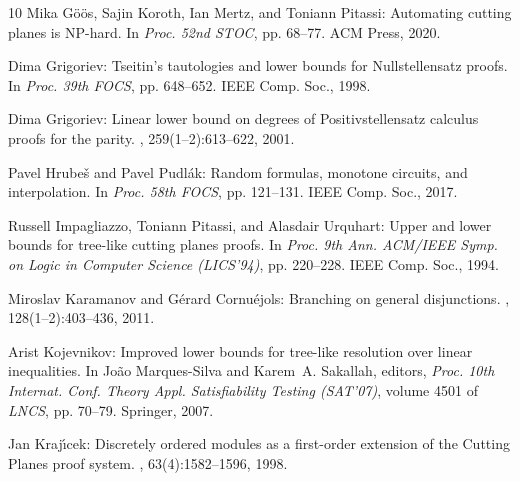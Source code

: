 \begin{thebibliography}{10}
{\sc Mika G{\"{o}}{\"{o}}s, Sajin Koroth, Ian Mertz, and Toniann Pitassi}:
  Automating cutting planes is {NP}-hard.
\newblock In {\em Proc. 52nd STOC}, pp. 68--77. ACM Press, 2020.
\newblock [\epfmtdoi{10.1145/3357713.3384248}]

{\sc Dima Grigoriev}: Tseitin's tautologies and lower bounds for
  {N}ullstellensatz proofs.
\newblock In {\em Proc. 39th FOCS}, pp. 648--652. IEEE Comp. Soc., 1998.

{\sc Dima Grigoriev}: Linear lower bound on degrees of {P}ositivstellensatz
  calculus proofs for the parity.
, 259(1--2):613--622, 2001.
\newblock [\epfmtdoi{10.1016/S0304-3975(00)00157-2}]

{\sc Pavel Hrube{\v{s}} and Pavel Pudl{\'{a}}k}: Random formulas, monotone
  circuits, and interpolation.
\newblock In {\em Proc. 58th FOCS}, pp. 121--131. IEEE Comp. Soc., 2017.

{\sc Russell Impagliazzo, Toniann Pitassi, and Alasdair Urquhart}: Upper and
  lower bounds for tree-like cutting planes proofs.
\newblock In {\em Proc. 9th Ann. ACM/IEEE Symp. on Logic in Computer Science
  (LICS'94)}, pp. 220--228. IEEE Comp. Soc., 1994.

{\sc Miroslav Karamanov and G{\'{e}}rard Cornu{\'{e}}jols}: Branching on
  general disjunctions.
, 128(1--2):403--436, 2011.
\newblock [\epfmtdoi{10.1007/s10107-009-0332-3}]

{\sc Arist Kojevnikov}: Improved lower bounds for tree-like resolution over
  linear inequalities.
\newblock In {\sc Jo{\~{a}}o Marques{-}Silva and Karem~A. Sakallah}, editors,
  {\em Proc. 10th Internat. Conf. Theory Appl. Satisfiability Testing
  (SAT'07)}, volume 4501 of {\em LNCS}, pp. 70--79. Springer, 2007.
\newblock [\epfmtdoi{10.1007/978-3-540-72788-0\_10}]

{\sc Jan Kraj{\'{\i}}cek}: Discretely ordered modules as a first-order
  extension of the {Cutting} {Planes} proof system.
, 63(4):1582--1596, 1998.
\newblock [\epfmtdoi{10.2307/2586668}]


\end{thebibliography}
